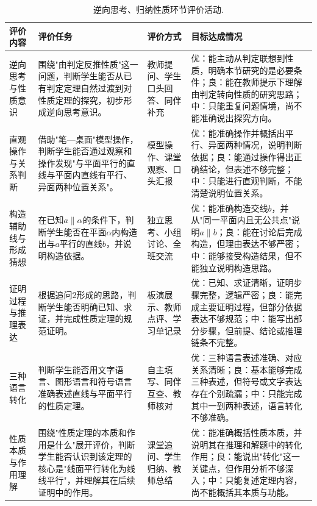 \documentclass[UTF8,a4paper,12pt,twoside]{ctexart}
\begin{document}
\begin{enumerate}
\renewcommand\arraystretch{1.5}
\begin{longtable}{|>{\centering\arraybackslash}p{}|>{\centering\arraybackslash}p{}|>{\centering\arraybackslash}p{}|>{\centering\arraybackslash}p{}|}
\caption{\label{tab4.3}逆向思考、归纳性质环节评价活动.} \\
\hline
评价内容 & 评价任务 & 评价方式 & 目标达成情况 \\
\hline
逆向思考与性质意识 & 围绕"由判定反推性质"这一问题，判断学生能否从已有判定定理自然过渡到对性质定理的探究，初步形成逆向思考意识。 & 教师提问、学生口头回答、同伴补充 & 优：能主动从判定联想到性质，明确本节研究的是必要条件；良：能在教师提示下理解由判定转向性质的研究思路；中：只能重复问题情境，尚不能准确说出探究方向。 \\
\hline
直观操作与关系判断 & 借助"笔—桌面"模型操作，判断学生能否通过观察和操作发现"与平面平行的直线与平面内直线有平行、异面两种位置关系"。 & 模型操作、课堂观察、口头汇报 & 优：能准确操作并概括出平行、异面两种情况，说明判断依据；良：能通过操作得出正确结论，但表述不够完整；中：只能进行直观判断，不能清楚说明位置关系。 \\
\hline
构造辅助线与形成猜想 & 在已知$a\parallel\alpha$的条件下，判断学生能否在平面$\alpha$内构造出与$a$平行的直线$b$，并说明构造依据。 & 独立思考、小组讨论、全班交流 & 优：能准确构造交线$b$，并从"同一平面内且无公共点"说明$a\parallel b$；良：能在讨论后完成构造，但理由表达不够严密；中：能够接受构造结果，但不能独立说明构造思路。 \\
\hline
证明过程与推理表达 & 根据追问2形成的思路，判断学生能否明确已知、求证，并完成性质定理的规范证明。 & 板演展示、教师点评、学习单记录 & 优：已知、求证清晰，证明步骤完整，逻辑严密；良：能完成主要证明过程，但部分依据表达不够规范；中：能写出部分步骤，但前提、结论或推理链条不完整。 \\
\hline
三种语言转化 & 判断学生能否用文字语言、图形语言和符号语言准确表述直线与平面平行的性质定理。 & 自主填写、同伴互查、教师核对 & 优：三种语言表述准确、对应关系清晰；良：基本能够完成三种表述，但符号或文字表达存在个别疏漏；中：只能完成其中一到两种表述，语言转化不够准确。 \\
\hline
性质本质与作用理解 & 围绕"性质定理的本质和作用是什么"展开评价，判断学生能否认识到该定理的核心是"线面平行转化为线线平行"，并理解其在后续证明中的作用。 & 课堂追问、学生归纳、教师总结 & 优：能准确概括性质本质，并说明其在推理和解题中的转化作用；良：能说出"转化"这一关键点，但作用分析不够深入；中：只能复述定理内容，尚不能概括其本质与功能。 \\
\hline
\end{longtable}

\vspace*{-10pt}

\end{enumerate}
\end{document}
